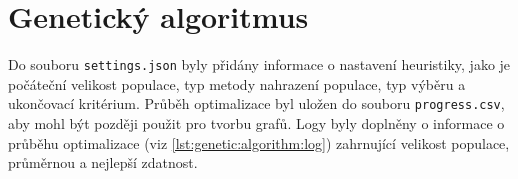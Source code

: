 \begin{table}[!htbp]
\centering
\caption[Přehled vybraných statistik z 2. sady experimentů]{~Přehled vybraných statistik z 2. sady experimentů}
\label{tab:brute:force:set:2:best:stats}
\end{table}


\section{Genetický algoritmus}
Do souboru \texttt{settings.json} byly přidány informace o nastavení heuristiky, jako je počáteční velikost populace, typ metody nahrazení populace, typ výběru a ukončovací kritérium.
Průběh optimalizace byl uložen do souboru \texttt{progress.csv}, aby mohl být později použit pro tvorbu grafů.
Logy byly doplněny o informace o průběhu optimalizace (viz \ref{lst:genetic:algorithm:log}) zahrnující velikost populace, průměrnou a nejlepší zdatnost.

